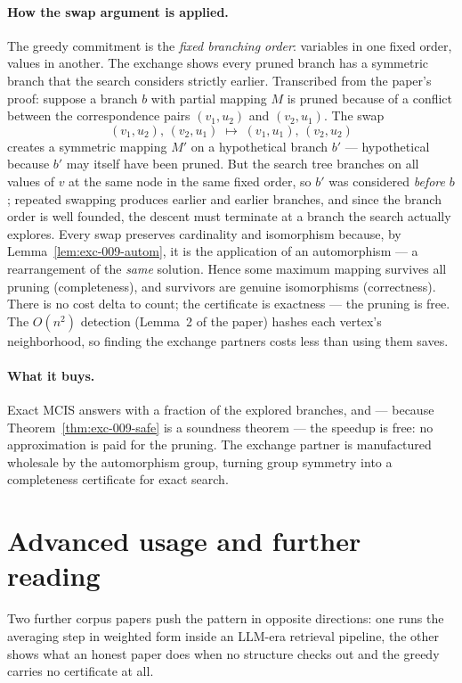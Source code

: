 \paragraph{How the swap argument is applied.}
The greedy commitment is the \emph{fixed branching order}: variables in one fixed
order, values in another. The exchange shows every pruned branch has a symmetric
branch that the search considers strictly earlier. Transcribed from the paper's
proof: suppose a branch $b$ with partial mapping $M$ is pruned because of a conflict
between the correspondence pairs $(v_1,u_2)$ and $(v_2,u_1)$. The swap
\[
(v_1,u_2),\,(v_2,u_1) \;\longmapsto\; (v_1,u_1),\,(v_2,u_2)
\]
creates a symmetric mapping $M'$ on a hypothetical branch $b'$ --- hypothetical
because $b'$ may itself have been pruned. But the search tree branches on all values
of $v$ at the same node in the same fixed order, so $b'$ was considered
\emph{before} $b$; repeated swapping produces earlier and earlier branches, and since
the branch order is well founded, the descent must terminate at a branch the search
actually explores. Every swap preserves cardinality and isomorphism because, by
Lemma~\ref{lem:exc-009-autom}, it is the application of an automorphism --- a
rearrangement of the \emph{same} solution. Hence some maximum mapping survives all
pruning (completeness), and survivors are genuine isomorphisms (correctness). There
is no cost delta to count; the certificate is exactness --- the pruning is free. The
$O(n^{2})$ detection (Lemma~2 of the paper) hashes each vertex's neighborhood, so
finding the exchange partners costs less than using them saves.

\paragraph{What it buys.}
Exact MCIS answers with a fraction of the explored branches, and --- because
Theorem~\ref{thm:exc-009-safe} is a soundness theorem --- the speedup is free: no
approximation is paid for the pruning. The exchange partner is manufactured wholesale
by the automorphism group, turning group symmetry into a completeness certificate for
exact search.

\section{Advanced usage and further reading}
\label{sec:exc-advanced}

Two further corpus papers push the pattern in opposite directions: one runs the
averaging step in weighted form inside an LLM-era retrieval pipeline, the other shows
what an honest paper does when no structure checks out and the greedy carries no
certificate at all.

